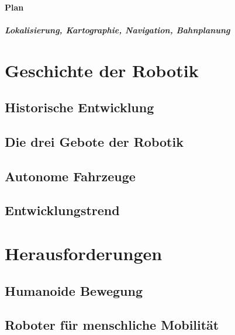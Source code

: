 \documentclass[a4paper, 11pt, accentcolor = tud3b]{tudreport}
\begin{document}
			\paragraph{Plan} %

				\subparagraph{Lokalisierung, Kartographie, Navigation, Bahnplanung} %

		\section{Geschichte der Robotik} %

			\subsection{Historische Entwicklung} %

			\subsection{Die drei Gebote der Robotik} %

			\subsection{Autonome Fahrzeuge} %

			\subsection{Entwicklungstrend} %

		\section{Herausforderungen} %

			\subsection{Humanoide Bewegung} %

			\subsection{Roboter für menschliche Mobilität} %
\end{document}
